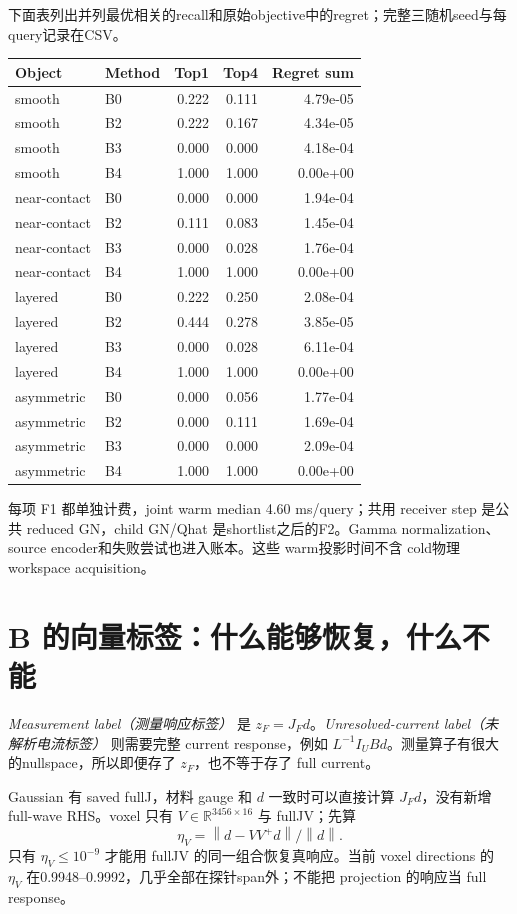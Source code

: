 \documentclass[UTF8,11pt,a4paper,fontset=fandol]{ctexart}
\newcommand{\norm}[1]{\left\lVert #1\right\rVert}
\newcommand{\R}{\mathbb{R}}
\begin{document}
下面表列出并列最优相关的recall和原始objective中的regret；完整三随机seed与每query记录在CSV。
\begin{center}\small\begin{tabular}{llrrr}\toprule Object & Method & Top1 & Top4 & Regret sum\\\midrule
smooth & B0 & 0.222 & 0.111 & 4.79e-05 \\
smooth & B2 & 0.222 & 0.167 & 4.34e-05 \\
smooth & B3 & 0.000 & 0.000 & 4.18e-04 \\
smooth & B4 & 1.000 & 1.000 & 0.00e+00 \\
near-contact & B0 & 0.000 & 0.000 & 1.94e-04 \\
near-contact & B2 & 0.111 & 0.083 & 1.45e-04 \\
near-contact & B3 & 0.000 & 0.028 & 1.76e-04 \\
near-contact & B4 & 1.000 & 1.000 & 0.00e+00 \\
layered & B0 & 0.222 & 0.250 & 2.08e-04 \\
layered & B2 & 0.444 & 0.278 & 3.85e-05 \\
layered & B3 & 0.000 & 0.028 & 6.11e-04 \\
layered & B4 & 1.000 & 1.000 & 0.00e+00 \\
asymmetric & B0 & 0.000 & 0.056 & 1.77e-04 \\
asymmetric & B2 & 0.000 & 0.111 & 1.69e-04 \\
asymmetric & B3 & 0.000 & 0.000 & 2.09e-04 \\
asymmetric & B4 & 1.000 & 1.000 & 0.00e+00 \\
\bottomrule\end{tabular}\end{center}

每项 F1 都单独计费，joint warm median 4.60 ms/query；共用 receiver step 是公共 reduced GN，child GN/Qhat 是shortlist之后的F2。Gamma normalization、source encoder和失败尝试也进入账本。这些 warm投影时间不含 cold物理workspace acquisition。

\section{B 的向量标签：什么能够恢复，什么不能}
\emph{Measurement label（测量响应标签）} 是 $z_F=J_Fd$。\emph{Unresolved-current label（未解析电流标签）} 则需要完整 current response，例如 $L^{-1}I_UBd$。测量算子有很大的nullspace，所以即便存了 $z_F$，也不等于存了 full current。

Gaussian 有 saved fullJ，材料 gauge 和 $d$ 一致时可以直接计算 $J_Fd$，没有新增 full-wave RHS。voxel 只有 $V\in\R^{3456\times16}$ 与 fullJV；先算
\[
 \eta_V=\norm{d-VV^+d}/\norm{d}.
\]
只有 $\eta_V\leq10^{-9}$ 才能用 fullJV 的同一组合恢复真响应。当前 voxel directions 的 $\eta_V$ 在0.9948--0.9992，几乎全部在探针span外；不能把 projection 的响应当 full response。
\end{document}
